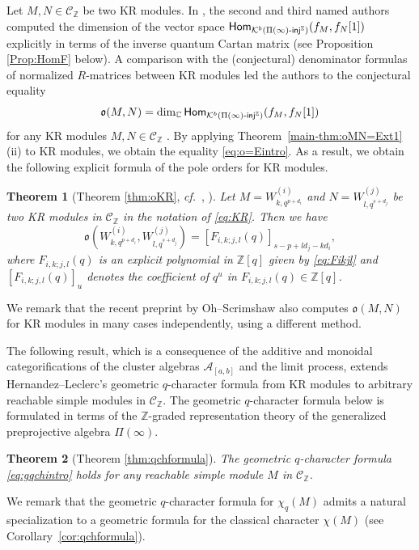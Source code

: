 \documentclass[12pt]{amsart}
\newtheorem{theorem}{Theorem}[section]
\theoremstyle{definition}
\theoremstyle{remark}
\numberwithin{equation}{section}
\newcommand{\opname}[1]{\operatorname{\mathsf{#1}}}
\newcommand{\Hom}{\opname{Hom}}
\newcommand{\confer}{\textit{cf.}\ }
\newcommand{\injc}{\mathchar`-\mathsf{inj}}
\begin{document}
Let $M,N\in\mathcal C_{\mathbb Z}$ be two KR modules. In \cite[\S5 \& Appendix A]{FM}, the second and third named authors computed the dimension of the vector space $\Hom_{\mathcal{K}^b(\Pi(\infty)\injc^\mathbb{Z})}(f_M, f_N[1])$ explicitly in terms of the inverse quantum Cartan matrix (see Proposition \ref{Prop:HomF} below). 
A comparison with the (conjectural) denominator formulas \cite[Conjecture 6.7]{Fujita-Oh-2021} of normalized $R$-matrices between KR modules led the authors to the conjectural equality    
\begin{equation} \label{eq:o=Eintro}
\mathfrak{o}(M,N) = \dim_{\mathbb{C}}\Hom_{\mathcal{K}^b(\Pi(\infty)\injc^\mathbb{Z})}(f_M, f_N[1])  
\end{equation}
for any KR modules $M,N \in \mathcal{C}_{\mathbb{Z}}$ \cite[Conjecture 5.17]{FM}. By applying
Theorem~\ref{main-thm:oMN=Ext1} (ii)  to KR modules, we obtain the equality \eqref{eq:o=Eintro}. As a result, we obtain the following explicit formula of the pole orders for KR modules.

\begin{theorem}[{Theorem \ref{thm:oKR}, \confer \cite[Conjecture 6.7]{Fujita-Oh-2021}, \cite[Conjecture 5.17]{FM}}] \label{main-thm:oKR}
Let $M=W^{(i)}_{k,q^{p+d_i}}$ and $N=W^{(j)}_{l,q^{s+d_j}}$ be two KR modules in $\mathcal C_{\mathbb Z}$ in the notation of \eqref{eq:KR}. Then we have
\[
\mathfrak{o}(W^{(i)}_{k,q^{p+d_i}}, W^{(j)}_{l,q^{s+d_j}}) = 
\left[ F_{i,k;j,l}(q)\right]_{s-p+ld_j-kd_i},
\]
where $F_{i,k; j,l}(q)$ is an explicit polynomial in $\mathbb{Z}[q]$ given by \eqref{eq:Fikjl} and $[F_{i,k; j,l}(q)]_u$ denotes the coefficient of $q^u$ in $F_{i,k; j,l}(q)\in \mathbb Z[q]$. 
\end{theorem}

We remark that the recent preprint by Oh--Scrimshaw \cite{OS} also computes $\mathfrak{o}(M,N) $ for KR modules in many cases independently, using a different method.   


 
  The following result, which is a consequence of the additive and monoidal categorifications of the cluster algebras $\mathcal{A}_{[a,b]}$ and the limit process, extends Hernandez--Leclerc's geometric $q$-character formula from KR modules to arbitrary reachable simple modules in $\mathcal{C}_{\mathbb{Z}}$.  The geometric $q$-character formula below is formulated in terms of the  $\mathbb Z$-graded representation theory of the generalized preprojective algebra $\Pi(\infty)$.
  
 
\begin{theorem}[Theorem \ref{thm:qchformula}] \label{main-thm:qchformula} 
The geometric $q$-character formula \eqref{eq:gqchintro} holds for any reachable simple module $M$ in $\mathcal C_{\mathbb Z}$.
\end{theorem}
We remark that the geometric $q$-character formula for $\chi_q(M)$ admits a natural specialization to a geometric formula for the classical character $\chi(M)$ (see Corollary~\ref{cor:qchformula}).
\end{document}
